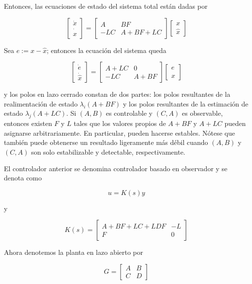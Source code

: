 \documentclass[11pt]{article}
\begin{document}
Entonces, las ecuaciones de estado del sistema total están dadas por

$$
\left[\begin{array}{c}
\dot{x} \\
\dot{\hat{x}}
\end{array}\right]=\left[\begin{array}{cc}
A & B F \\
-L C & A+B F+L C
\end{array}\right]\left[\begin{array}{l}
x \\
\hat{x}
\end{array}\right]
$$

Sea $e:=x-\hat{x}$; entonces la ecuación del sistema queda

$$
\left[\begin{array}{c}
\dot{e} \\
\dot{\hat{x}}
\end{array}\right]=\left[\begin{array}{cc}
A+L C & 0 \\
-L C & A+B F
\end{array}\right]\left[\begin{array}{l}
e \\
\hat{x}
\end{array}\right]
$$

y los polos en lazo cerrado constan de dos partes: los polos resultantes de la realimentación de estado $\lambda_{i}(A+B F)$ y los polos resultantes de la estimación de estado $\lambda_{j}(A+L C)$. Si $(A, B)$ es controlable y $(C, A)$ es observable, entonces existen $F$ y $L$ tales que los valores propios de $A+B F$ y $A+L C$ pueden asignarse arbitrariamente. En particular, pueden hacerse estables. Nótese que también puede obtenerse un resultado ligeramente más débil cuando $(A, B)$ y $(C, A)$ son solo estabilizable y detectable, respectivamente.

El controlador anterior se denomina controlador basado en observador y se denota como

$$
u=K(s) y
$$

y

$$
K(s)=\left[\begin{array}{c|c}
A+B F+L C+L D F & -L \\
\hline F & 0
\end{array}\right]
$$

Ahora denotemos la planta en lazo abierto por

$$
G=\left[\begin{array}{c|c}
A & B \\
\hline C & D
\end{array}\right]
$$
\end{document}

